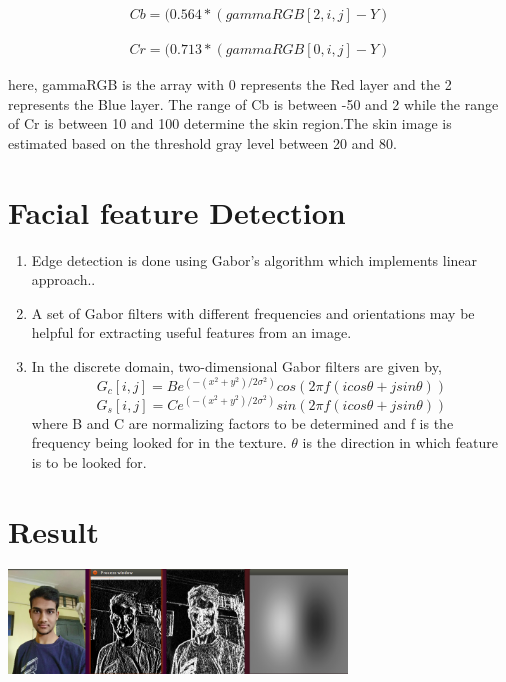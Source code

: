 \documentclass[journal]{IEEEtran}
\begin{document}
	\begin{equation}
	\begin{split}
	Cb=(0.564*(gammaRGB[2,i,j]-Y)
	\end{split}
	\end{equation}
	
	
	\begin{equation}
	\begin{split}
	Cr=(0.713*(gammaRGB[0,i,j]-Y)
	\end{split}
	\end{equation}
	
	 here, gammaRGB is the array with 0 represents the Red
	layer and the 2 represents the Blue layer. The range of Cb
	is between -50 and 2 while the range of Cr is between 10
	and 100 determine the skin region.The skin image is estimated based on the threshold
	gray level between 20 and 80.
	
	\section{\textbf{Facial feature Detection}}
	\begin{enumerate}
	    \item Edge detection is done using Gabor's algorithm which implements linear approach..
	    \item A set of Gabor filters with different frequencies and orientations may be helpful for extracting useful features from an image.
	    \item In the discrete domain, two-dimensional Gabor filters are given by,\\
	    \begin{equation}
	        G_c[i, j] = Be^{(-(x^2+y^2)/2\sigma^2)}cos(2\pi f(icos\theta + jsin\theta))
	    \end{equation}
	    \begin{equation}
	        G_s[i, j] = Ce^{(-(x^2+y^2)/2\sigma^2)}sin(2\pi f(icos\theta + jsin\theta))
	    \end{equation}
	    where B and C are normalizing factors to be determined and f is the frequency being looked for in the texture. $\theta$ is the direction in which feature is to be looked for.
	\end{enumerate}
	
\newpage
\section{\textbf{Result}}
    \begin{minipage}{\linewidth}
		\centering
		\includegraphics[width = 90mm]{gabor_crop.png}
	\end{minipage} 
	
\end{document}
